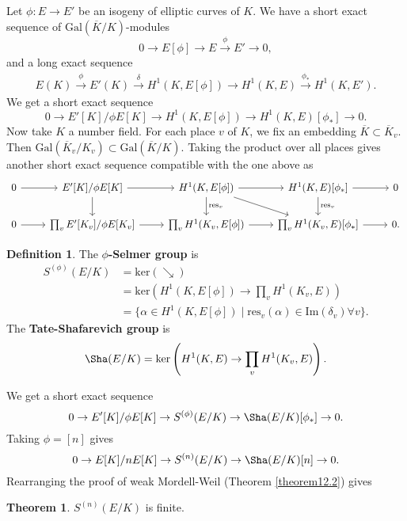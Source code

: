 \documentclass{article}
\theoremstyle{definition}
\newtheorem{theorem}{Theorem}[section]
\newtheorem{defn}{Definition}[section]
\begin{document}
Let $\phi : E \to E'$ be an isogeny of elliptic curves of $K$. We have a short exact sequence of $\text{Gal}(\overline{K}/K)$-modules \[
0 \to E[\phi] \to E \stackrel{\phi}{\to} E' \to 0,
\]
and a long exact sequence
\begin{align*}
    E(K) \stackrel{\phi}{\to} E'(K) \stackrel{\delta}{\to} H^1(K,E[\phi]) \to H^1(K,E) \stackrel{\phi_*}{\to} H^1(K,E'). 
\end{align*}
We get a short exact sequence $$0 \to E'[K]/\phi E[K] \to H^1(K,E[\phi]) \to H^1(K,E)[\phi_*] \to 0.$$
Now take $K$ a number field. For each place $v$ of $K$, we fix an embedding $\overline{K} \subset \overline{K}_v$. Then $\text{Gal}(\overline{K}_v/K_v) \subset \text{Gal}(\overline{K}/K)$. Taking the product over all places gives another short exact sequence compatible with the one above as \[
\begin{tikzcd}
    0 \arrow{r}{} & E'[K]/\phi E[K] \arrow{r}{}\arrow{d} & H^1(K,E[\phi]) \arrow{r}\arrow {d}{\text{res}_v}\arrow{dr}& H^1(K,E)[\phi_*] \arrow{r} \arrow{d}{\text{res}_v} & 0\\
    0 \arrow{r} & \prod_{v}^{} E'[K_v]/\phi E[K_v] \arrow{r} & \prod_{v}^{} H^1(K_v,E[\phi]) \arrow{r}& \prod_{v}^{}  H^1(K_v,E)[\phi_*] \arrow{r} & 0.
\end{tikzcd}
\]
\begin{defn}\label{defna}
    The \textbf{$\phi$-Selmer group} is 
    \begin{align*}
        S^{(\phi)}(E/K) &= \text{ker}(\searrow) \\
        &= \text{ker}\left(H^1(K,E[\phi]) \to \prod_{v}^{} H^1(K_v,E)\right)\\
        &=\{\alpha \in H^1(K,E[\phi]) \mid \text{res}_v(\alpha) \in \text{Im}(\delta_v) \forall v\}.
    \end{align*}
    The \textbf{Tate-Shafarevich group} is \[
        \Sha(E/K) = \text{ker}\left(H^1(K,E) \to \prod_{v}^{} H^1(K_v,E)\right).
    \]
\end{defn}
We get a short exact sequence 
\[
0 \to E'[K]/\phi E[K] \to S^{(\phi)}(E/K) \to \Sha(E/K)[\phi_*] \to 0.
\]
Taking $\phi = [n]$ gives \[
0 \to E[K]/nE[K] \to S^{(n)}(E/K) \to \Sha(E/K)[n] \to 0.
\]
Rearranging the proof of weak Mordell-Weil (Theorem \ref{theorem12.2}) gives
\begin{theorem}\label{theorem15.5}
    $S^{(n)}(E/K)$ is finite.
\end{theorem}
\end{document}
